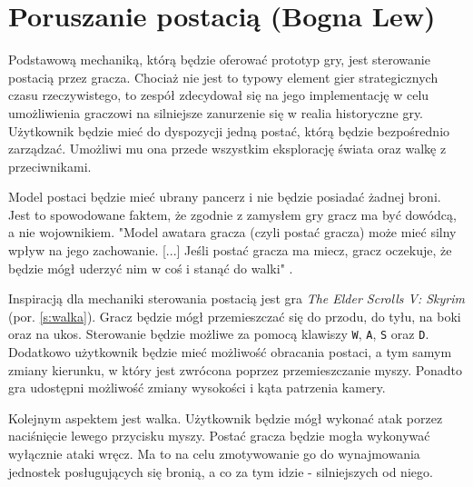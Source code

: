 \section{Poruszanie postacią (Bogna Lew)}\label{s:por_proj}
Podstawową mechaniką, którą będzie oferować prototyp gry, jest sterowanie postacią przez gracza. Chociaż nie jest
to typowy element gier strategicznych czasu rzeczywistego, to zespół zdecydował się na jego implementację w celu umożliwienia
graczowi na silniejsze zanurzenie się w realia historyczne gry. Użytkownik będzie
mieć do dyspozycji jedną postać, którą będzie bezpośrednio zarządzać. Umożliwi mu ona przede wszystkim eksplorację
świata oraz walkę z przeciwnikami.

Model postaci będzie mieć ubrany pancerz i nie będzie posiadać żadnej broni. Jest to spowodowane faktem, że zgodnie z
zamysłem gry gracz ma być dowódcą, a nie wojownikiem. "Model awatara gracza (czyli postać gracza) może mieć silny wpływ
na jego zachowanie. [...] Jeśli postać gracza ma miecz, gracz oczekuje, że będzie mógł uderzyć nim w coś i stanąć do
walki" \cite{projektowanie_gier}.

Inspiracją dla mechaniki sterowania postacią jest gra \textit{The Elder Scrolls V: Skyrim} (por. \ref{s:walka}). Gracz będzie mógł przemieszczać się
do przodu, do tyłu, na boki oraz na ukos. Sterowanie będzie możliwe za pomocą klawiszy \texttt{W}, \texttt{A}, \texttt{S} oraz \texttt{D}.
Dodatkowo użytkownik będzie mieć możliwość obracania postaci, a tym samym zmiany kierunku, w który jest zwrócona poprzez
przemieszczanie myszy. Ponadto gra udostępni możliwość zmiany wysokości i kąta patrzenia kamery.

Kolejnym aspektem jest walka. Użytkownik będzie mógł wykonać atak porzez naciśnięcie lewego przycisku myszy. Postać
gracza będzie mogła wykonywać wyłącznie ataki wręcz. Ma to na celu zmotywowanie go do wynajmowania jednostek posługujących
się bronią, a co za tym idzie - silniejszych od niego.